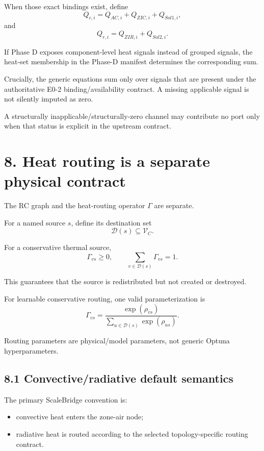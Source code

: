 \documentclass[11pt]{article}
\newcommand{\Vc}{\mathcal{V}_{C}}
\begin{document}
When those exact bindings exist, define
\[
\boxed{
Q_{c,i}
=
Q_{AC,i}+Q_{ZIC,i}+Q_{Sol1,i},
}
\tag{E0.3-4}
\]
and
\[
\boxed{
Q_{r,i}
=
Q_{ZIR,i}+Q_{Sol2,i}.
}
\tag{E0.3-5}
\]

If Phase D exposes component-level heat signals instead of grouped signals,
the heat-set membership in the Phase-D manifest determines the corresponding
sum.

Crucially, the generic equations sum only over signals that are present under
the authoritative E0-2 binding/availability contract.  A missing applicable
signal is not silently imputed as zero.

A structurally inapplicable/structurally-zero channel may contribute no port
only when that status is explicit in the upstream contract.

\section*{8. Heat routing is a separate physical contract}

The RC graph and the heat-routing operator $\Gamma$ are separate.

For a named source $s$, define its destination set
\[
\mathcal{D}(s)\subseteq\Vc.
\]

For a conservative thermal source,
\[
\boxed{
\Gamma_{vs}\ge 0,
\qquad
\sum_{v\in\mathcal{D}(s)}\Gamma_{vs}=1.
}
\tag{E0.3-6}
\]

This guarantees that the source is redistributed but not created or destroyed.

For learnable conservative routing, one valid parameterization is
\[
\boxed{
\Gamma_{vs}
=
\frac{\exp(\rho_{vs})}
{\sum_{u\in\mathcal{D}(s)}\exp(\rho_{us})}.
}
\tag{E0.3-7}
\]

Routing parameters are physical/model parameters, not generic Optuna
hyperparameters.

\subsection*{8.1 Convective/radiative default semantics}

The primary ScaleBridge convention is:
\begin{itemize}
    \item convective heat enters the zone-air node;
    \item radiative heat is routed according to the selected topology-specific
          routing contract.
\end{itemize}
\end{document}
